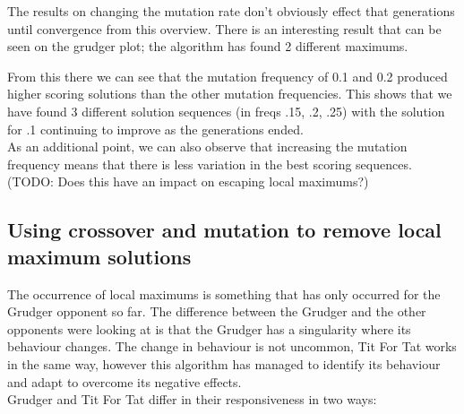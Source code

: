 
            The results on changing the mutation rate don't obviously effect that generations until convergence from this overview. There is an interesting result that can be seen on the grudger plot; the algorithm has found 2 different maximums.   


            From this there we can see that the mutation frequency of 0.1 and 0.2 produced higher scoring solutions than the other mutation frequencies. This shows that we have found 3 different solution sequences (in freqs .15, .2, .25) with the solution for .1 continuing to improve as the generations ended.\\
            
            As an additional point, we can also observe that increasing the mutation frequency means that there is less variation in the best scoring sequences. (TODO: Does this have an impact on escaping local maximums?)

            \subsection{Using crossover and mutation to remove local maximum solutions}

            The occurrence of local maximums is something that has only occurred for the Grudger opponent so far. The difference between the Grudger and the other opponents were looking at is that the Grudger has a singularity where its behaviour changes. The change in behaviour is not uncommon, Tit For Tat works in the same way, however this algorithm has managed to identify its behaviour and adapt to overcome its negative effects.\\
            
            Grudger and Tit For Tat differ in their responsiveness in two ways: 
            
